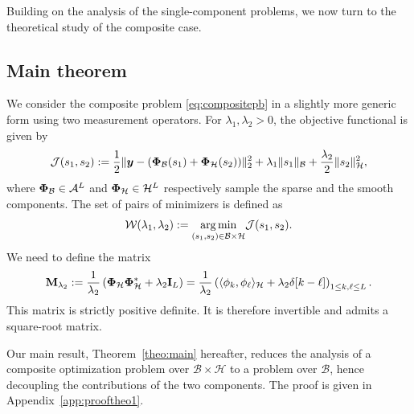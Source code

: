 \documentclass[12pt]{article}
\begin{document}
    Building on the analysis of the single-component problems, we now turn to the theoretical study of the composite case.

    \subsection{Main theorem}

    We consider the composite problem \eqref{eq:compositepb} in a slightly more generic form using two measurement operators. For $\lambda_1, \lambda_2 > 0$, the objective functional is given by
    \begin{equation}
        \label{eq:composite-optim}
        \mathcal{J}(s_1, s_2) := \frac{1}{2} \| \bm{y} - (\bm{\Phi}_\mathcal{B} (s_1) + \bm{\Phi}_\mathcal{H} (s_2)) \|_2^2  + \lambda_{1} \| s_1 \|_{\mathcal{B}} + \frac{\lambda_{2}}{2} \| s_2 \|_{\mathcal{H}}^2,
    \end{equation}
    where $\bm{\Phi}_\mathcal{B} \in \mathcal{A}^L$ and $\bm{\Phi}_\mathcal{H}\in\mathcal{H}^L$ respectively sample the sparse and the smooth components. 
    The set of pairs of minimizers is defined as
    \begin{equation} \label{eq:argminisback}
        \mathcal{W} (\lambda_{1},\lambda_{2}) := \underset{(s_1,s_2) \in \mathcal{B} \times \mathcal{H}}{\arg\min} \mathcal{J}(s_1, s_2).
    \end{equation}
    We need to define the matrix
    \begin{equation}
        \label{eq:def-Mphi}
        \mathbf{M}_{\lambda_{2}} := \frac{1}{\lambda_{2}} \left(\bm{\Phi}_\mathcal{H}\bm{\Phi}_\mathcal{H}^* + \lambda_{2} \mathbf{I}_L\right) = \frac{1}{\lambda_{2}} \left( \langle \phi_k , \phi_\ell \rangle_{\mathcal{H}} + \lambda_{2} \delta[k - \ell] \right)_{1\leq k, \ell \leq L}.
    \end{equation}
    This matrix is strictly positive definite. It is therefore invertible and admits a square-root matrix.

    Our main result, Theorem~\ref{theo:main} hereafter, reduces the analysis of a composite optimization problem over $\mathcal{B}\times\mathcal{H}$ to a problem over $\mathcal{B}$, hence decoupling the contributions of the two components. The proof is given in Appendix~\ref{app:prooftheo1}.
\end{document}
